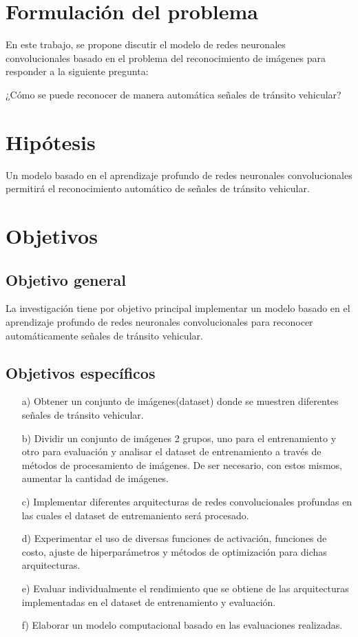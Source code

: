 \section{Formulación del problema}

  En este trabajo, se propone discutir el modelo de redes neuronales convolucionales basado en el problema del reconocimiento de imágenes para responder a la siguiente pregunta:
 \begin{center} 
     ¿Cómo se puede reconocer de manera automática señales de tránsito vehicular?
 \end{center}

\section{Hipótesis}
	 Un modelo basado en el aprendizaje profundo de redes neuronales convolucionales permitirá el reconocimiento automático de señales de tránsito vehicular.



\section{Objetivos}
	\subsection{Objetivo general}
	La investigación tiene por objetivo principal implementar un modelo basado en el aprendizaje profundo de redes neuronales convolucionales para reconocer automáticamente señales de tránsito vehicular.
	
	\vskip 0.2cm
		
	\subsection{Objetivos específicos}
	\begin{enumerate}
	
	\item[a)] Obtener un conjunto de imágenes(dataset) donde se muestren diferentes señales de tránsito vehicular.
	\item[b)] Dividir un conjunto de imágenes 2 grupos, uno para el entrenamiento y otro para evaluación y analisar el dataset de entrenamiento a través de métodos de procesamiento de imágenes. De ser necesario, con estos mismos, aumentar la cantidad de imágenes.
	\item[c)] Implementar diferentes arquitecturas de redes convolucionales profundas en las cuales el dataset de entremaniento será procesado.
	\item[d)] Experimentar el uso de diversas funciones de activación, funciones de costo, ajuste de hiperparámetros y métodos de optimización para dichas arquitecturas. 
	\item[e)] Evaluar individualmente el rendimiento que se obtiene de las arquitecturas implementadas en el dataset de entrenamiento y evaluación.
	\item[f)] Elaborar un modelo computacional basado en las evaluaciones realizadas.
	\end{enumerate}



